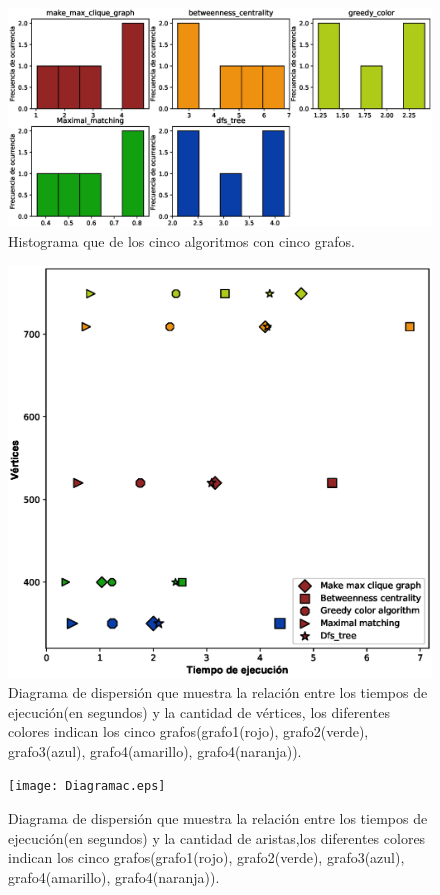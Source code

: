 \documentclass{article}
\begin{document}
\begin{center}
\begin{figure}[h]
\includegraphics[scale=0.6]{Histograma.eps}
\caption{Histograma que de los cinco algoritmos con cinco grafos.}
\end{figure}
\begin{figure}[h]
\includegraphics[scale=0.7]{DiagramVertices.eps}
\caption{Diagrama de dispersión que muestra la relación entre los tiempos de ejecución(en segundos) y la cantidad de vértices, los diferentes colores indican los cinco grafos(grafo1(rojo), grafo2(verde), grafo3(azul), grafo4(amarillo), grafo4(naranja)).}
\end{figure}
\begin{figure}[h]
\texttt{[image: Diagramac.eps]}
\caption{Diagrama de dispersión que muestra la relación entre los tiempos de ejecución(en segundos) y la cantidad de aristas,los diferentes colores indican los cinco grafos(grafo1(rojo), grafo2(verde), grafo3(azul), grafo4(amarillo), grafo4(naranja)).}
\end{figure}
 \end{center}
\newpage

\newpage


\end{document}
